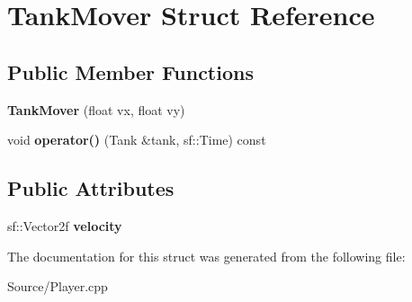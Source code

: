 \hypertarget{struct_tank_mover}{}\section{Tank\+Mover Struct Reference}
\label{struct_tank_mover}
\subsection*{Public Member Functions}
\begin{DoxyCompactItemize}
\item 
\hypertarget{struct_tank_mover_a5d258dd173645327fbfbb85ac509fb6b}{}{\bfseries Tank\+Mover} (float vx, float vy)\label{struct_tank_mover_a5d258dd173645327fbfbb85ac509fb6b}

\item 
\hypertarget{struct_tank_mover_a70f04079ab46af7909625ec05b1b1a5f}{}void {\bfseries operator()} (Tank \&tank, sf\+::\+Time) const \label{struct_tank_mover_a70f04079ab46af7909625ec05b1b1a5f}

\end{DoxyCompactItemize}
\subsection*{Public Attributes}
\begin{DoxyCompactItemize}
\item 
\hypertarget{struct_tank_mover_a46d37dc7f19ddcf216dbc0627cc0de25}{}sf\+::\+Vector2f {\bfseries velocity}\label{struct_tank_mover_a46d37dc7f19ddcf216dbc0627cc0de25}

\end{DoxyCompactItemize}


The documentation for this struct was generated from the following file\+:\begin{DoxyCompactItemize}
\item 
Source/Player.\+cpp\end{DoxyCompactItemize}
